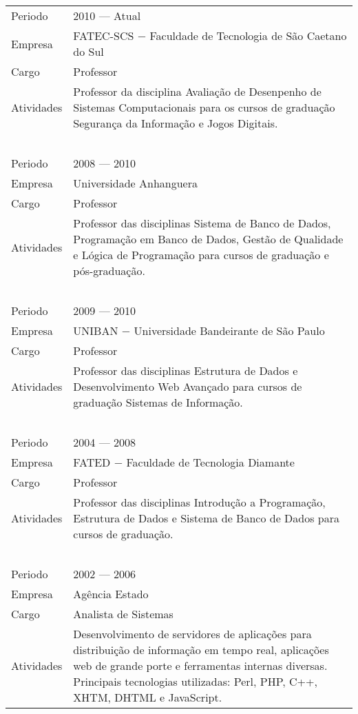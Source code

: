 \documentclass[a4paper, oneside, final]{scrartcl}
\begin{document}
\begin{center}
\begin{tabularx}{0.97\linewidth}{p{2cm}X}
Periodo     & 2010 --- Atual\\
Empresa     & FATEC-SCS $-$ Faculdade de Tecnologia de São Caetano do Sul\\
Cargo       & Professor\\
Atividades  & Professor da disciplina Avaliação de Desenpenho de Sistemas Computacionais para os cursos de graduação Segurança da Informação e Jogos Digitais.\\
            & \ \\

Periodo     & 2008 --- 2010\\
Empresa     & Universidade Anhanguera\\
Cargo       & Professor\\
Atividades  & Professor das disciplinas Sistema de Banco de Dados, Programação em Banco de Dados, Gestão de Qualidade e Lógica de Programação para cursos de graduação e pós-graduação.\\
            & \ \\

Periodo     & 2009 --- 2010\\
Empresa     & UNIBAN $-$ Universidade Bandeirante de São Paulo\\
Cargo       & Professor\\
Atividades  & Professor das disciplinas Estrutura de Dados e Desenvolvimento Web Avançado para cursos de graduação Sistemas de Informação.\\
            & \ \\

Periodo     & 2004 --- 2008\\
Empresa     & FATED $-$ Faculdade de Tecnologia Diamante\\
Cargo       & Professor\\
Atividades  & Professor das disciplinas Introdução a Programação, Estrutura de Dados e Sistema de Banco de Dados para cursos de graduação.\\
            & \ \\

Periodo     & 2002 --- 2006\\
Empresa     & Agência Estado\\
Cargo       & Analista de Sistemas\\
Atividades  & Desenvolvimento de servidores de aplicações para distribuição de informação em tempo real, aplicações web de grande porte e ferramentas internas diversas. Principais tecnologias utilizadas: Perl, PHP, C++, XHTM, DHTML e JavaScript.\\
\end{tabularx}


\end{center}
\end{document}
